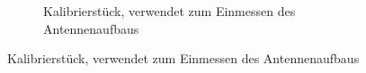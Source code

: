 \begin{figure}[H]
\begin{subfigure}[h]{0.4\textwidth}
                 \caption{Kalibrierstück, verwendet zum Einmessen des Antennenaufbaus}
                 \label{fig:calib_piece}
         \end{subfigure}
         \label{fig:Calibration_Tools}
\end{figure}
 
